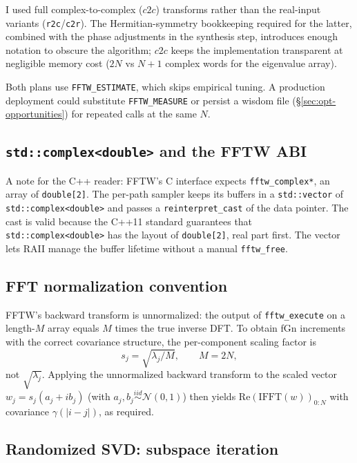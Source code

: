 I used full complex-to-complex ($c2c$) transforms rather than the real-input
variants (\texttt{r2c}/\texttt{c2r}).  The Hermitian-symmetry bookkeeping
required for the latter, combined with the phase adjustments in the synthesis
step, introduces enough notation to obscure the algorithm; $c2c$ keeps the
implementation transparent at negligible memory cost ($2N$ vs $N{+}1$ complex
words for the eigenvalue array).

Both plans use \texttt{FFTW\_ESTIMATE}, which skips empirical tuning.  A
production deployment could substitute \texttt{FFTW\_MEASURE} or persist a
wisdom file (§\ref{sec:opt-opportunities}) for repeated calls at the same $N$.

\subsection{\texttt{std::complex<double>} and the FFTW ABI}
\label{sec:complex-cast}

A note for the C++ reader: FFTW's C interface expects \texttt{fftw\_complex*}, an
array of \texttt{double[2]}.  The per-path sampler keeps its buffers in a
\texttt{std::vector} of \texttt{std::complex<double>} and passes a
\texttt{reinterpret\_cast} of the data pointer.  The cast is valid because the C++11
standard guarantees that \texttt{std::complex<double>} has the layout of
\texttt{double[2]}, real part first.  The vector lets RAII manage the buffer
lifetime without a manual \texttt{fftw\_free}.

\subsection{FFT normalization convention}
\label{sec:normalization}

FFTW's backward transform is unnormalized: the output of
\texttt{fftw\_execute} on a length-$M$ array equals $M$ times the true
inverse DFT.  To obtain fGn increments with the correct covariance structure,
the per-component scaling factor is
\begin{equation}
  s_j = \sqrt{\lambda_j / M}, \qquad M = 2N,
\end{equation}
not $\sqrt{\lambda_j}$.  Applying the unnormalized backward transform to the
scaled vector $w_j = s_j(a_j + ib_j)$ (with $a_j, b_j \overset{iid}{\sim}
\mathcal{N}(0,1)$) then yields $\mathrm{Re}(\mathrm{IFFT}(w))_{0:N}$ with
covariance $\gamma(|i-j|)$, as required.

\subsection{Randomized SVD: subspace iteration}
\label{sec:poweriter}

